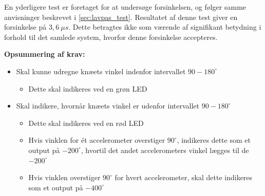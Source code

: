 \noindent
En yderligere test er foretaget for at undersøge forsinkelsen, og følger samme anvisninger beskrevet i \autoref{sec:lavpas_test}.  
Resultatet af denne test giver en forsinkelse på  $3,6~\mu s$. Dette betragtes ikke som værende af signifikant betydning i forhold til det samlede system, hvorfor denne forsinkelse accepteres.


\vspace{3mm}
\textbf{Opsummering af krav:}
\begin{itemize}
\item[\text{\sffamily \checkmark}] Skal kunne udregne knæets vinkel indenfor intervallet $90-180^{\circ}$
\begin{itemize}
\item Dette skal indikeres ved en grøn LED
\end{itemize}
\item[\text{\sffamily \checkmark}] Skal indikere, hvornår knæets vinkel er udenfor intervallet $90-180^{\circ}$
\begin{itemize}
\item Dette skal indikeres ved en rød LED
\item Hvis vinklen for ét accelerometer overstiger $90^{\circ}$, indikeres dette som et output på $-200^{\circ}$, hvortil det andet accelerometers vinkel lægges til de $-200^{\circ}$
\item Hvis vinklen overstiger $90^{\circ}$ for hvert accelerometer, skal dette indikeres som et output på $-400^{\circ}$
\end{itemize}
\end{itemize}